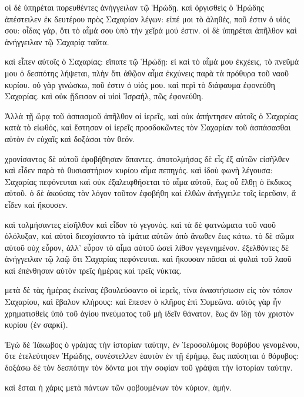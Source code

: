 \pend\pstart
οἱ δὲ ὑπηρέται πορευθέντες ἀνήγγειλαν τῷ Ἡρώδῃ. καὶ ὀργισθεὶς ὁ Ἡρώδης ἀπέστειλεν ἐκ δευτέρου πρὸς Σαχαρίαν λέγων: εἰπέ μοι τὸ ἀληθές, ποῦ ἐστιν ὁ υἱός σου: οἶδας γάρ, ὅτι τὸ αἷμά σου ὑπὸ τὴν χεῖρά μού ἐστιν. οἱ δὲ ὑπηρέται ἀπῆλθον καὶ ἀνήγγειλαν τῷ Σαχαρίᾳ ταῦτα.

\pend\pstart
καὶ εἶπεν αὐτοῖς ὁ Σαχαρίας: εἴπατε τῷ Ἡρώδῃ: εἰ καὶ τὸ αἷμά μου ἐκχέεις, τὸ πνεῦμά μου ὁ δεσπότης λήψεται, πλὴν ὅτι ἀθῷον αἷμα ἐκχύνεις παρὰ τὰ πρόθυρα τοῦ ναοῦ κυρίου. οὐ γὰρ γινώσκω, ποῦ ἐστιν ὁ υἱός μου. καὶ περὶ τὸ διάφαυμα ἐφονεύθη Σαχαρίας. καὶ οὐκ ᾔδεισαν οἱ υἱοὶ Ἰσραήλ, πῶς ἐφονεύθη.

\pend\pstart
{}

\pend\pstart
Ἀλλὰ τῇ ὥρᾳ τοῦ ἀσπασμοῦ ἀπῆλθον οἱ ἱερεῖς, καὶ οὐκ ἀπήντησεν αὐτοῖς ὁ Σαχαρίας κατὰ τὸ εἰωθός, καὶ ἔστησαν οἱ ἱερεῖς προσδοκῶντες τὸν Σαχαρίαν τοῦ ἀσπάσασθαι αὐτὸν ἐν εὐχαῖς καὶ δοξάσαι τὸν θεόν.

\pend\pstart
χρονίσαντος δὲ αὐτοῦ ἐφοβήθησαν ἅπαντες. ἀποτολμήσας δὲ εἷς ἐξ αὐτῶν εἰσῆλθεν καὶ εἶδεν παρὰ τὸ θυσιαστήριον κυρίου αἷμα πεπηγός. καὶ ἰδοὺ φωνὴ λέγουσα: Σαχαρίας πεφόνευται καὶ οὐκ ἐξαλειφθήσεται τὸ αἷμα αὐτοῦ, ἕως οὗ ἔλθῃ ὁ ἔκδικος αὐτοῦ. ὁ δὲ ἀκούσας τὸν λόγον τοῦτον ἐφοβήθη καὶ ἐλθὼν ἀνήγγειλε τοῖς ἱερεῦσιν, ἅ εἶδεν καὶ ἤκουσεν.

\pend\pstart
καὶ τολμήσαντες εἰσῆλθον καὶ εἶδον τὸ γεγονός. καὶ τὰ δὲ φατνώματα τοῦ ναοῦ ὀλόλυξαν, καὶ αὐτοὶ διεσχίσαντο τὰ ἱμάτια αὐτῶν ἀπὸ ἄνωθεν ἕως κάτω. τὸ δὲ σῶμα αὐτοῦ οὐχ εὗρον, ἀλλ' εὗρον τὸ αἷμα αὐτοῦ ὡσεὶ λίθον γεγενημένον. ἐξελθόντες δὲ ἀνήγγειλαν τῷ λαῷ ὅτι Σαχαρίας πεφόνευται. καὶ ἤκουσαν πᾶσαι αἱ φυλαὶ τοῦ λαοῦ καὶ ἐπένθησαν αὐτὸν τρεῖς ἡμέρας καὶ τρεῖς νύκτας.

\pend\pstart
μετὰ δὲ τὰς ἡμέρας ἐκείνας ἐβουλεύσαντο οἱ ἱερεῖς, τίνα ἀναστήσωσιν εἰς τὸν τόπον Σαχαρίου, καὶ ἔβαλον κλήρους: καὶ ἔπεσεν ὁ κλῆρος ἐπὶ Συμεῶνα. αὐτὸς γὰρ ἦν χρηματισθεὶς ὑπὸ τοῦ ἁγίου πνεύματος τοῦ μὴ ἰδεῖν θάνατον, ἕως ἄν ἴδῃ τὸν χριστὸν κυρίου (ἐν σαρκί).

\pend\pstart
{}

\pend\pstart
Ἐγὼ δὲ Ἰάκωβος ὁ γράψας τὴν ἱστορίαν ταύτην, ἐν Ἱεροσολύμοις θορύβου γενομένου, ὅτε ἐτελεύτησεν Ἡρώδης, συνέστελλεν ἑαυτὸν ἐν τῇ ἐρήμῳ, ἕως παύσηται ὁ θόρυβος: δοξάσω δὲ τὸν δεσπότην τὸν δόντα μοι τὴν σοφίαν τοῦ γράψαι τὴν ἱστορίαν ταύτην.

\pend\pstart
καὶ ἔσται ἡ χάρις μετὰ πάντων τῶν φοβουμένων τὸν κύριον, ἀμήν.

\pend
